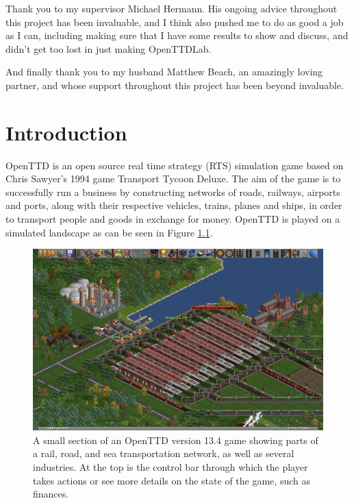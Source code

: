 \documentclass[logo,msc,dsti]{infthesis}    %
\begin{document}
\begin{preliminary}
\begin{acknowledgements}
Thank you to my supervisor Michael Hermann. His ongoing advice throughout this project has been invaluable, and I think also pushed me to do as good a job as I can, including making sure that I have some results to show and discuss, and didn't get too lost in just making OpenTTDLab.

And finally thank you to my husband Matthew Beach, an amazingly loving partner, and whose support throughout this project has been beyond invaluable. 

\end{acknowledgements}


\tableofcontents
\end{preliminary}


\chapter{Introduction}
\label{chapter:introduction}

OpenTTD \cite{openttd} is an open source real time strategy (RTS) simulation game based on  Chris Sawyer's 1994 game Transport Tycoon Deluxe. The aim of the game is to successfully run a business by constructing networks of roads, railways, airports and ports, along with their respective vehicles, trains, planes and ships, in order to transport people and goods in exchange for money. OpenTTD is played on a simulated landscape as can be seen in Figure \ref{figure:introduction-screenshot}.

\begin{figure}[h]
\centering
\includegraphics[width=\columnwidth]{assets/01_introduction_01_screenshot.png}
\caption{A small section of an OpenTTD version 13.4 game showing parts of a rail, road, and sea transportation network, as well as several industries. At the top is the control bar through which the player takes actions or see more details on the state of the game, such as finances.}
\label{figure:introduction-screenshot}
\end{figure}
\end{document}
